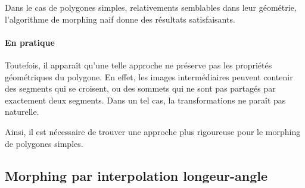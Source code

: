 \begin{codeb}
    Dans le cas de polygones simples, relativements semblables dans leur géométrie, 
    l'algorithme de morphing naif donne des résultats satisfaisants.
\end{codeb}

\paragraph{En pratique} Toutefois, il apparaît qu'une telle approche ne préserve pas les propriétés géométriques
du polygone. En effet, les images intermédiaires peuvent contenir des segments qui se croisent, 
ou des sommets qui ne sont pas partagés par exactement deux segments. Dans un tel cas, la transformations
ne paraît pas naturelle.

Ainsi, il est nécessaire de trouver une approche plus rigoureuse pour le morphing de polygones simples.

\subsection[Méthode L-A]{Morphing par interpolation longeur-angle}

